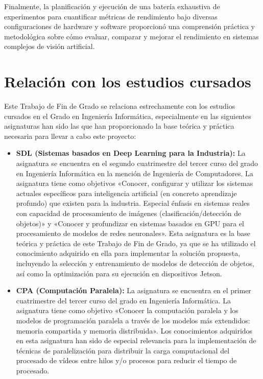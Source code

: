 \documentclass[11pt,spanish,listoffigures,listoftables]{tfgetsinf}
\begin{document}
Finalmente, la planificación y ejecución de una batería exhaustiva de experimentos para cuantificar métricas de rendimiento bajo diversas configuraciones de hardware y software proporcionó una comprensión práctica y metodológica sobre cómo evaluar, comparar y mejorar el rendimiento en sistemas complejos de visión artificial.


\section{Relación con los estudios cursados}

Este Trabajo de Fin de Grado se relaciona estrechamente con los estudios cursados en el Grado en Ingeniería Informática, especialmente en las siguientes asignaturas han sido las que han proporcionado la base teórica y práctica necesaria para llevar a cabo este proyecto:

\begin{itemize}
   \item \textbf{SDL (Sistemas basados en Deep Learning para la Industria):} La asignatura se encuentra en el segundo cuatrimestre del tercer curso del grado en Ingeniería Informática en la mención de Ingeniería de Computadores. La asignatura tiene como objetivos «Conocer, configurar y utilizar los sistemas actuales específicos para inteligencia artificial (en concreto aprendizaje profundo) que existen para la industria. Especial énfasis en sistemas reales con capacidad de procesamiento de imágenes (clasificación/detección de objetos)» y «Conocer y profundizar en sistemas basados en GPU para el procesamiento de modelos de redes neuronales». Esta asignatura es la base teórica y práctica de este Trabajo de Fin de Grado, ya que se ha utilizado el conocimiento adquirido en ella para implementar la solución propuesta, incluyendo la selección y entrenamiento de modelos de detección de objetos, así como la optimización para su ejecución en dispositivos Jetson.
   
   \item \textbf{CPA (Computación Paralela):} La asignatura se encuentra en el primer cuatrimestre del tercer curso del grado en Ingeniería Informática. La asignatura tiene como objetivo «Conocer la computación paralela y los modelos de programación paralela a través de los modelos más extendidos: memoria compartida y memoria distribuida». Los conocimientos adquiridos en esta asignatura han sido de especial relevancia para la implementación de técnicas de paralelización para distribuir la carga computacional del procesado de vídeos entre hilos y/o procesos para reducir el tiempo de procesado.
\end{itemize}
\end{document}
